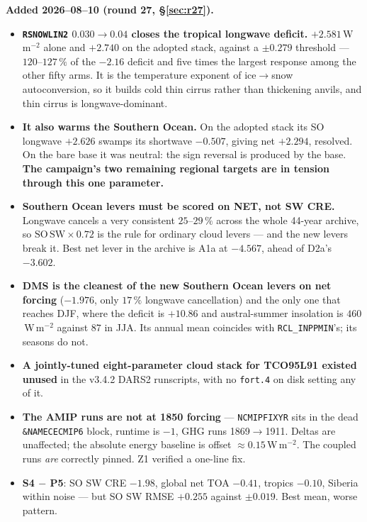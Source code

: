 \documentclass[10pt]{article}
\begin{document}
\textbf{Added 2026--08--10 (round 27, \S\ref{sec:r27}).}
\begin{itemize}\itemsep2pt
\item \textbf{\texttt{RSNOWLIN2} $0.030\to0.04$ closes the tropical longwave deficit.}
$+2.581$\,W\,m$^{-2}$ alone and $+2.740$ on the adopted stack, against a $\pm0.279$
threshold --- $120$--$127\,\%$ of the $-2.16$ deficit and five times the largest response
among the other fifty arms. It is the temperature exponent of ice$\to$snow autoconversion,
so it builds cold thin cirrus rather than thickening anvils, and thin cirrus is
longwave-dominant.
\item \textbf{It also warms the Southern Ocean.} On the adopted stack its SO longwave
$+2.626$ swamps its shortwave $-0.507$, giving net $+2.294$, resolved. On the bare base it
was neutral: the sign reversal is produced by the base. \textbf{The campaign's two
remaining regional targets are in tension through this one parameter.}
\item \textbf{Southern Ocean levers must be scored on NET, not SW CRE.} Longwave cancels a
very consistent $25$--$29\,\%$ across the whole 44-year archive, so
$\mathrm{SO\,SW}\times0.72$ is the rule for ordinary cloud levers --- and the new levers
break it. Best net lever in the archive is A1a at $-4.567$, ahead of D2a's $-3.602$.
\item \textbf{DMS is the cleanest of the new Southern Ocean levers on net forcing}
($-1.976$, only $17\,\%$ longwave cancellation) and the only one that reaches DJF, where
the deficit is $+10.86$ and austral-summer insolation is $460$\,W\,m$^{-2}$ against $87$
in JJA. Its annual mean coincides with \texttt{RCL\_INPPMIN}'s; its seasons do not.
\item \textbf{A jointly-tuned eight-parameter cloud stack for TCO95L91 existed unused} in
the v3.4.2 DARS2 runscripts, with no \texttt{fort.4} on disk setting any of it.
\item \textbf{The AMIP runs are not at 1850 forcing} --- \texttt{NCMIPFIXYR} sits in the
dead \texttt{\&NAMECECMIP6} block, runtime is $-1$, GHG runs 1869$\to$1911. Deltas are
unaffected; the absolute energy baseline is offset ${\approx}0.15$\,W\,m$^{-2}$. The
coupled runs \emph{are} correctly pinned. Z1 verified a one-line fix.
\item \textbf{S4 $-$ P5}: SO SW CRE $-1.98$, global net TOA $-0.41$, tropics $-0.10$,
Siberia within noise --- but SO SW RMSE $+0.255$ against $\pm0.019$. Best mean, worse
pattern.
\end{itemize}
\end{document}
